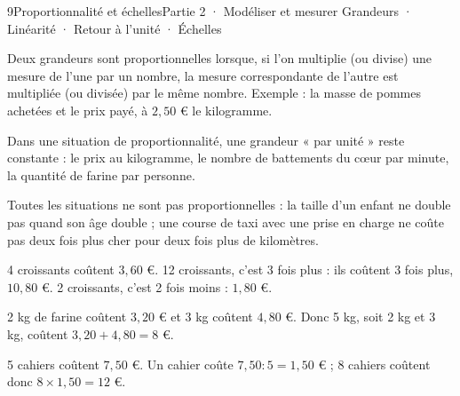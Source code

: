 \begin{ouverture}[grandeurs]{9}{Proportionnalité et échelles}{Partie 2 · Modéliser et mesurer}
{Grandeurs · Linéarité · Retour à l’unité · Échelles}
\end{ouverture}
\pagestyle{otMain}\essentiel\fontsize{11}{15}\selectfont
{}\label{cours-9-1}
\begin{definition}Deux grandeurs sont proportionnelles lorsque, si l’on multiplie (ou divise) une mesure de l’une par un nombre, la mesure correspondante de l’autre est multipliée (ou divisée) par le même nombre. Exemple : la masse de pommes achetées et le prix payé, à $2{,}50$ € le kilogramme.\end{definition}
\begin{propriete}Dans une situation de proportionnalité, une grandeur « par unité » reste constante : le prix au kilogramme, le nombre de battements du cœur par minute, la quantité de farine par personne.\end{propriete}
\begin{attention}Toutes les situations ne sont pas proportionnelles : la taille d’un enfant ne double pas quand son âge double ; une course de taxi avec une prise en charge ne coûte pas deux fois plus cher pour deux fois plus de kilomètres.\end{attention}
\begin{savoirfaire}4 croissants coûtent $3{,}60$ €. 12 croissants, c’est 3 fois plus : ils coûtent 3 fois plus, $10{,}80$ €. 2 croissants, c’est 2 fois moins : $1{,}80$ €.\end{savoirfaire}
\begin{savoirfaire}2 kg de farine coûtent $3{,}20$ € et 3 kg coûtent $4{,}80$ €. Donc 5 kg, soit 2 kg et 3 kg, coûtent $3{,}20+4{,}80=8$ €.\end{savoirfaire}
\clearpage
{}\label{cours-9-2}
\begin{savoirfaire}5 cahiers coûtent $7{,}50$ €. Un cahier coûte $7{,}50:5=1{,}50$ € ; 8 cahiers coûtent donc $8\times1{,}50=12$ €.\end{savoirfaire}
\label{fig-cours-9-2-cours-tableau-fleches}

